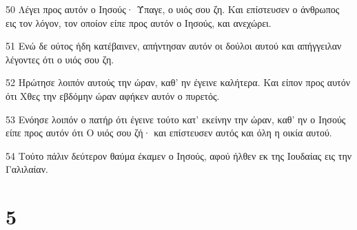 \par 50 Λέγει προς αυτόν ο Ιησούς· Ύπαγε, ο υιός σου ζη. Και επίστευσεν ο άνθρωπος εις τον λόγον, τον οποίον είπε προς αυτόν ο Ιησούς, και ανεχώρει.
\par 51 Ενώ δε ούτος ήδη κατέβαινεν, απήντησαν αυτόν οι δούλοι αυτού και απήγγειλαν λέγοντες ότι ο υιός σου ζη.
\par 52 Ηρώτησε λοιπόν αυτούς την ώραν, καθ' ην έγεινε καλήτερα. Και είπον προς αυτόν ότι Χθες την εβδόμην ώραν αφήκεν αυτόν ο πυρετός.
\par 53 Ενόησε λοιπόν ο πατήρ ότι έγεινε τούτο κατ' εκείνην την ώραν, καθ' ην ο Ιησούς είπε προς αυτόν ότι Ο υιός σου ζή· και επίστευσεν αυτός και όλη η οικία αυτού.
\par 54 Τούτο πάλιν δεύτερον θαύμα έκαμεν ο Ιησούς, αφού ήλθεν εκ της Ιουδαίας εις την Γαλιλαίαν.

\chapter{5}

